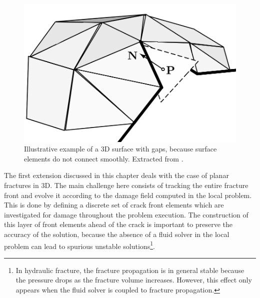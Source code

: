 \begin{figure}[h]
    \centering
    \includegraphics[width=0.6\linewidth]{Chapter4/figures/surface_with_gap.png}
    \caption{Illustrative example of a 3D surface with gaps, because surface elements do not connect smoothly. Extracted from \cite{gasser20063d}.}
    \label{fig:gaps}
\end{figure}

The first extension discussed in this chapter deals with the case of planar fractures in 3D. The main challenge here consists of tracking the entire fracture front and evolve it according to the damage field computed in the local problem. This is done by defining a discrete set of crack front elements which are investigated for damage throughout the problem execution. The construction of this layer of front elements ahead of the crack is important to preserve the accuracy of the solution, because the absence of a fluid solver in the local problem can lead to spurious unstable solutions\footnote{In hydraulic fracture, the fracture propagation is in general stable because the pressure drops as the fracture volume increases. However, this effect only appears when the fluid solver is coupled to fracture propagation.}.  